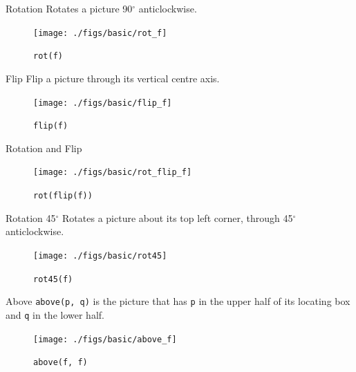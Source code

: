\documentclass{beamer}
\begin{document}
    \begin{frame}{Rotation}
        Rotates a picture 90$^{\circ}$ anticlockwise.

        \begin{figure}
            \centering
            \texttt{[image: ./figs/basic/rot\_f]}
            \caption{\texttt{rot(f)}\label{fig:rot_f}}
        \end{figure}
    \end{frame}

    \begin{frame}{Flip}
    	Flip a picture through its vertical centre axis.

        \begin{figure}
            \centering
            \texttt{[image: ./figs/basic/flip\_f]}
            \caption{\texttt{flip(f)}\label{fig:flip_f}}
        \end{figure}
    \end{frame}

    \begin{frame}{Rotation and Flip}

        \begin{figure}
            \centering
            \texttt{[image: ./figs/basic/rot\_flip\_f]}
            \caption{\texttt{rot(flip(f))}\label{fig:rot_flip_f}}
        \end{figure}
    \end{frame}

    \begin{frame}{Rotation 45$^{\circ}$}
    	Rotates a picture about its top left corner, through 45$^{\circ}$ anticlockwise.

        \begin{figure}
            \centering
            \texttt{[image: ./figs/basic/rot45]}
            \caption{\texttt{rot45(f)}\label{fig:rot45}}
        \end{figure}
    \end{frame}

    \begin{frame}{Above}
        \texttt{above(p, q)} is the picture that has \texttt{p} in the upper half
        of its locating box and \texttt{q} in the lower half.

        \begin{figure}
            \centering
            \texttt{[image: ./figs/basic/above\_f]}
            \caption{\texttt{above(f, f)}\label{fig:above}}
        \end{figure}
    \end{frame}
\end{document}
